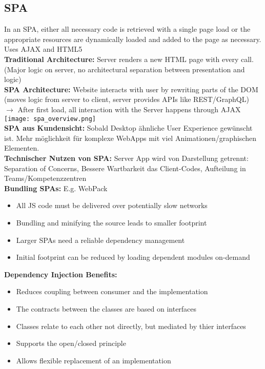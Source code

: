 \subsection{SPA}
In an SPA, either all necessary code is retrieved with a single page load or the appropriate resources are dynamically loaded and added to the page as necessary. Uses AJAX and HTML5\\
\textcolor{b}{\textbf{Traditional Architecture:}} Server renders a new HTML page with every call. (Major logic on server, no architectural separation between presentation and logic)\\
\textcolor{b}{\textbf{SPA Architecture:}} Website interacts with user by rewriting parts of the DOM (moves logic from server to client, server provides APIs like REST/GraphQL) $\rightarrow$ After first load, all interaction with the Server happens through AJAX
\texttt{[image: spa\_overview.png]}\\
\textcolor{b}{\textbf{SPA aus Kundensicht:}} Sobald Desktop ähnliche User Experience gewünscht ist. Mehr möglichkeit für komplexe WebApps mit viel Animationen/graphischen Elementen.\\
\textcolor{b}{\textbf{Technischer Nutzen von SPA:}} Server App wird von Darstellung getrennt: Separation of Concerns, Bessere Wartbarkeit das Client-Codes, Aufteilung in Teams/Kompetenzzentren\\
\textcolor{b}{\textbf{Bundling SPAs:}} E.g. WebPack
\begin{itemize}[topsep=0pt, leftmargin=3mm]
    \setlength\itemsep{-0.3em}
    \item All JS code must be delivered over potentially slow networks
    \item Bundling and minifying the source leads to smaller footprint
    \item Larger SPAs need a reliable dependency management
    \item Initial footprint can be reduced by loading dependent modules on-demand
\end{itemize}
\textcolor{b}{\textbf{Dependency Injection Benefits:}}
\begin{itemize}[topsep=0pt, leftmargin=3mm]
    \setlength\itemsep{-0.3em}
    \item Reduces coupling between consumer and the implementation
    \item The contracts between the classes are based on interfaces
    \item Classes relate to each other not directly, but mediated by thier interfaces
    \item Supports the open/closed principle
    \item Allows flexible replacement of an implementation
\end{itemize}